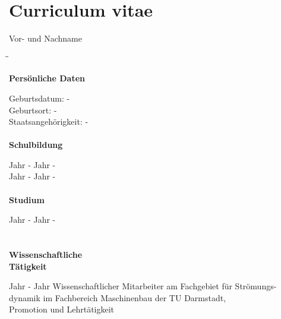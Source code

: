 \chapter*{Curriculum vitae}

	{\Large Vor- und Nachname}

\vspace{0.5cm}

\begin{tabbing}
\hspace{4.2cm}\=\hspace{4.2cm}\=\kill

{\bfseries Persönliche Daten} \\
\bigskip

Geburtsdatum:                \> -\\
Geburtsort:                  \> -\\
Staatsangehörigkeit:         \> -\\
{ }\\

{\bfseries Schulbildung}\\
\bigskip

Jahr - Jahr			\>	-\\

Jahr - Jahr			\>	-\\
\\

{\bfseries Studium}\\
\bigskip

Jahr - Jahr			\>	-\\
{ }\\\\

{\bfseries Wissenschaftliche}\\
{\bfseries Tätigkeit}\\
\bigskip

Jahr - Jahr			\>	Wissenschaftlicher Mitarbeiter am Fachgebiet für Strömungs-\\
					\>	dynamik im Fachbereich Maschinenbau der TU Darmstadt,\\
					\>	Promotion und Lehrtätigkeit\\													
\end{tabbing}
